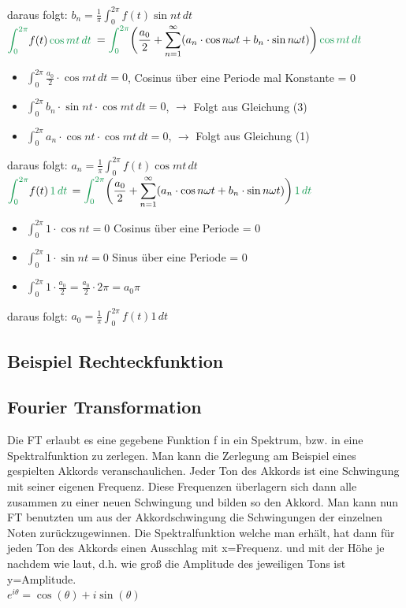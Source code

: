 \documentclass[12pt,a4paper]{article}
\newcommand{\green}[1]{\textcolor{ForestGreen} {#1}}
\newcommand{\nl}{\\[0.1cm]}
\begin{document}
daraus folgt:
$\displaystyle b_n = \frac{1}{\pi} \int_0^{2\pi} f(t) \sin nt \, dt$\nl
$\displaystyle \green{\int_0^{2\pi}} f(t)\, \green{\cos mt \, dt}$
$\displaystyle = \green{\int_0^{2\pi}} \bigg( \frac{a_0}{2} + \sum_{n=1}^\infty (a_n \cdot \cos n\omega t + b_n\cdot \sin n\omega t)\bigg)\, \green{\cos mt\, dt}$
\begin{itemize}
\item $\displaystyle \int_0^{2\pi} \frac{a_0}{2} \cdot \cos mt \, dt = 0$, \quad Cosinus über eine Periode mal Konstante = 0
\item $\displaystyle \int_0^{2\pi} b_n \cdot \sin nt \cdot  \cos mt \, dt = 0$, \quad$\rightarrow$ Folgt aus Gleichung (3)
\item $\displaystyle \int_0^{2\pi} a_n \cdot \cos nt \cdot  \cos mt \, dt = 0$, \quad$\rightarrow$ Folgt aus Gleichung (1)
\end{itemize}
daraus folgt:
$\displaystyle a_n = \frac{1}{\pi} \int_0^{2\pi} f(t) \cos mt \, dt$\nl
$\displaystyle \green{\int_0^{2\pi}} f(t)\, \green{1 \, dt}$
$\displaystyle = \green{\int_0^{2\pi}} \bigg( \frac{a_0}{2} + \sum_{n=1}^\infty (a_n \cdot \cos n\omega t + b_n\cdot \sin n\omega t)\bigg)\, \green{1\, dt}$
\begin{itemize}
\item $\displaystyle \int_0^{2\pi} 1 \cdot \cos nt = 0$ \quad Cosinus über eine Periode = 0
\item $\displaystyle \int_0^{2\pi} 1 \cdot \sin nt = 0$ \quad Sinus über eine Periode = 0
\item $\displaystyle \int_0^{2\pi} 1 \cdot \frac{a_0}{2} = \frac{a_0}{2} \cdot 2\pi = a_0 \pi$ 
\end{itemize}
daraus folgt:
$\displaystyle a_0 = \frac{1}{\pi} \int_0^{2\pi} f(t) 1\, dt$


\subsection{Beispiel Rechteckfunktion}


\subsection{Fourier Transformation}
Die FT erlaubt es eine gegebene Funktion f in ein Spektrum, bzw. in eine Spektralfunktion zu zerlegen. Man kann die Zerlegung am Beispiel eines gespielten Akkords veranschaulichen. Jeder Ton des Akkords ist eine Schwingung mit seiner eigenen Frequenz. Diese Frequenzen überlagern sich dann alle zusammen zu einer neuen Schwingung und bilden so den Akkord. Man kann nun FT benutzten um aus der Akkordschwingung die Schwingungen der einzelnen Noten zurückzugewinnen. Die Spektralfunktion welche man erhält, hat dann für jeden Ton des Akkords einen Ausschlag mit x=Frequenz. und mit der Höhe je nachdem wie laut, d.h. wie groß die Amplitude des jeweiligen Tons ist y=Amplitude.\nl
$e^{i\theta}  =  \cos (\theta) + i \sin (\theta)$
\end{document}
